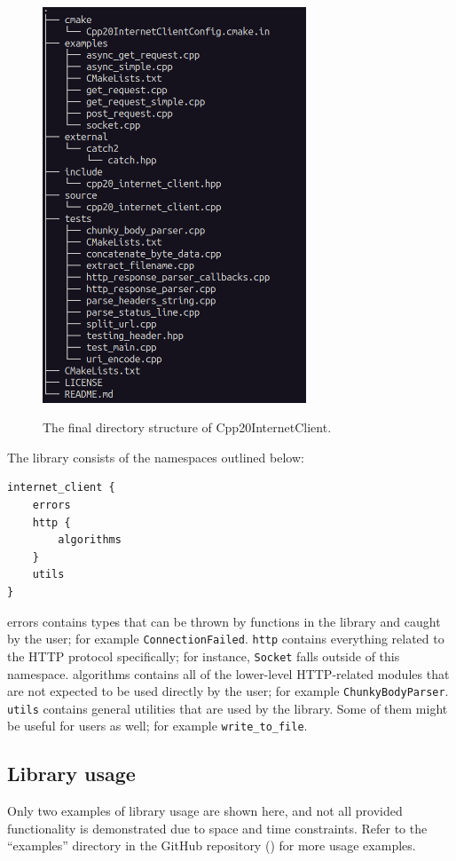 \documentclass[12pt, a4paper]{article}
\begin{document}
\begin{figure}[hp]
	\centering
	\caption{The final directory structure of Cpp20InternetClient.}
	\includegraphics[width=0.7\textwidth]{directory_structure}
	\label{fig:directory_structure}
\end{figure}

The library consists of the namespaces outlined below:

\begin{verbatim}
internet_client {
    errors
    http {
        algorithms
    }
    utils
}	
\end{verbatim}

errors contains types that can be thrown by functions in the library and caught by the user; for example \texttt{ConnectionFailed}. \texttt{http} contains everything related to the HTTP protocol specifically; for instance, \texttt{Socket} falls outside of this namespace. algorithms contains all of the lower-level HTTP-related modules that are not expected to be used directly by the user; for example \texttt{ChunkyBodyParser}. \texttt{utils} contains general utilities that are used by the library. Some of them might be useful for users as well; for example \texttt{write\_to\_file}.
\subsection{Library usage}
Only two examples of library usage are shown here, and not all provided functionality is demonstrated due to space and time constraints. Refer to the “examples” directory in the GitHub repository (\cite{Cpp20InternetClient}) for more usage examples.
\end{document}
